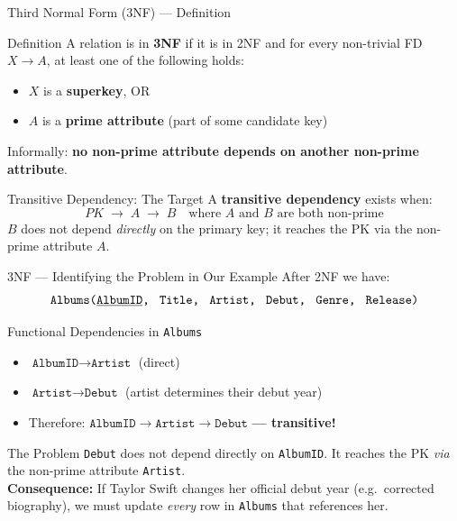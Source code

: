 \begin{frame}{Third Normal Form (3NF) --- Definition}
  \begin{block}{Definition}
    A relation is in \textbf{3NF} if it is in 2NF and for every non-trivial
    FD $X \to A$, at least one of the following holds:
    \begin{itemize}
      \item $X$ is a \textbf{superkey}, OR
      \item $A$ is a \textbf{prime attribute} (part of some candidate key)
    \end{itemize}
    Informally: \textbf{no non-prime attribute depends on another non-prime attribute}.
  \end{block}

  \begin{block}{Transitive Dependency: The Target}
    A \textbf{transitive dependency} exists when:
    \[
      PK \;\to\; A \;\to\; B
      \quad \text{where } A \text{ and } B \text{ are both non-prime}
    \]
    $B$ does not depend \emph{directly} on the primary key; it reaches
    the PK via the non-prime attribute $A$.
  \end{block}
\end{frame}

\begin{frame}{3NF --- Identifying the Problem in Our Example}
  After 2NF we have:
  \[
    \texttt{Albums(\underline{AlbumID},\; Title,\; Artist,\; Debut,\; Genre,\; Release)}
  \]

  \vspace{4pt}
  \begin{block}{Functional Dependencies in \texttt{Albums}}
    \begin{itemize}
      \item $\texttt{AlbumID} \to \texttt{Artist}$ \quad (direct)
      \item $\texttt{Artist} \to \texttt{Debut}$ \quad (artist determines their debut year)
      \item Therefore: $\texttt{AlbumID} \to \texttt{Artist} \to \texttt{Debut}$
            \textbf{--- transitive!}
    \end{itemize}
  \end{block}

  \begin{alertblock}{The Problem}
    \texttt{Debut} does not depend directly on \texttt{AlbumID}.  It reaches
    the PK \emph{via} the non-prime attribute \texttt{Artist}.\\[4pt]
    \textbf{Consequence:} If Taylor Swift changes her official debut year
    (e.g.\ corrected biography), we must update \emph{every} row in
    \texttt{Albums} that references her.
  \end{alertblock}
\end{frame}

